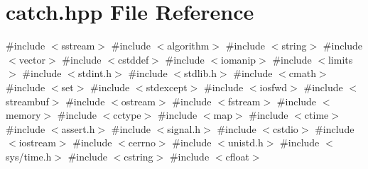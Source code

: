 \section{catch.\+hpp File Reference}
\label{catch_8hpp}
{\ttfamily \#include $<$sstream$>$}\newline
{\ttfamily \#include $<$algorithm$>$}\newline
{\ttfamily \#include $<$string$>$}\newline
{\ttfamily \#include $<$vector$>$}\newline
{\ttfamily \#include $<$cstddef$>$}\newline
{\ttfamily \#include $<$iomanip$>$}\newline
{\ttfamily \#include $<$limits$>$}\newline
{\ttfamily \#include $<$stdint.\+h$>$}\newline
{\ttfamily \#include $<$stdlib.\+h$>$}\newline
{\ttfamily \#include $<$cmath$>$}\newline
{\ttfamily \#include $<$set$>$}\newline
{\ttfamily \#include $<$stdexcept$>$}\newline
{\ttfamily \#include $<$iosfwd$>$}\newline
{\ttfamily \#include $<$streambuf$>$}\newline
{\ttfamily \#include $<$ostream$>$}\newline
{\ttfamily \#include $<$fstream$>$}\newline
{\ttfamily \#include $<$memory$>$}\newline
{\ttfamily \#include $<$cctype$>$}\newline
{\ttfamily \#include $<$map$>$}\newline
{\ttfamily \#include $<$ctime$>$}\newline
{\ttfamily \#include $<$assert.\+h$>$}\newline
{\ttfamily \#include $<$signal.\+h$>$}\newline
{\ttfamily \#include $<$cstdio$>$}\newline
{\ttfamily \#include $<$iostream$>$}\newline
{\ttfamily \#include $<$cerrno$>$}\newline
{\ttfamily \#include $<$unistd.\+h$>$}\newline
{\ttfamily \#include $<$sys/time.\+h$>$}\newline
{\ttfamily \#include $<$cstring$>$}\newline
{\ttfamily \#include $<$cfloat$>$}\newline
